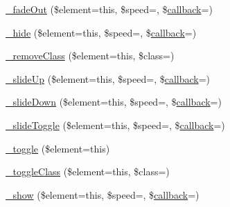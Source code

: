 \begin{DoxyCompactItemize}
\item 
\mbox{\hyperlink{class_c_i___jquery_a450b3e1f437001e56dcb15ad73ef4b93}{\+\_\+fade\+Out}} (\$element=\textquotesingle{}this\textquotesingle{}, \$speed=\textquotesingle{}\textquotesingle{}, \$\mbox{\hyperlink{_functions_8php_ae2242eb47799ca6a822b022dc1bd1ac9}{callback}}=\textquotesingle{}\textquotesingle{})
\item 
\mbox{\hyperlink{class_c_i___jquery_a11a78a5297f13443708684ef7858a49c}{\+\_\+hide}} (\$element=\textquotesingle{}this\textquotesingle{}, \$speed=\textquotesingle{}\textquotesingle{}, \$\mbox{\hyperlink{_functions_8php_ae2242eb47799ca6a822b022dc1bd1ac9}{callback}}=\textquotesingle{}\textquotesingle{})
\item 
\mbox{\hyperlink{class_c_i___jquery_af268174048a2d84ad3df004cec7b0a04}{\+\_\+remove\+Class}} (\$element=\textquotesingle{}this\textquotesingle{}, \$class=\textquotesingle{}\textquotesingle{})
\item 
\mbox{\hyperlink{class_c_i___jquery_a60ec32e453a0d1788fd444e35eca4de4}{\+\_\+slide\+Up}} (\$element=\textquotesingle{}this\textquotesingle{}, \$speed=\textquotesingle{}\textquotesingle{}, \$\mbox{\hyperlink{_functions_8php_ae2242eb47799ca6a822b022dc1bd1ac9}{callback}}=\textquotesingle{}\textquotesingle{})
\item 
\mbox{\hyperlink{class_c_i___jquery_ac21f8bc7079c6a6e7faf04706a268728}{\+\_\+slide\+Down}} (\$element=\textquotesingle{}this\textquotesingle{}, \$speed=\textquotesingle{}\textquotesingle{}, \$\mbox{\hyperlink{_functions_8php_ae2242eb47799ca6a822b022dc1bd1ac9}{callback}}=\textquotesingle{}\textquotesingle{})
\item 
\mbox{\hyperlink{class_c_i___jquery_aa00f8e284d752d889cb03e24d6313688}{\+\_\+slide\+Toggle}} (\$element=\textquotesingle{}this\textquotesingle{}, \$speed=\textquotesingle{}\textquotesingle{}, \$\mbox{\hyperlink{_functions_8php_ae2242eb47799ca6a822b022dc1bd1ac9}{callback}}=\textquotesingle{}\textquotesingle{})
\item 
\mbox{\hyperlink{class_c_i___jquery_aa1c932f4aba1d5c8259da4dfd7e7a106}{\+\_\+toggle}} (\$element=\textquotesingle{}this\textquotesingle{})
\item 
\mbox{\hyperlink{class_c_i___jquery_afcfe440e86ec038bc62ac9be2296313b}{\+\_\+toggle\+Class}} (\$element=\textquotesingle{}this\textquotesingle{}, \$class=\textquotesingle{}\textquotesingle{})
\item 
\mbox{\hyperlink{class_c_i___jquery_afc1e291a9264809af8cbb0bb4a30dcb2}{\+\_\+show}} (\$element=\textquotesingle{}this\textquotesingle{}, \$speed=\textquotesingle{}\textquotesingle{}, \$\mbox{\hyperlink{_functions_8php_ae2242eb47799ca6a822b022dc1bd1ac9}{callback}}=\textquotesingle{}\textquotesingle{})

\end{DoxyCompactItemize}
